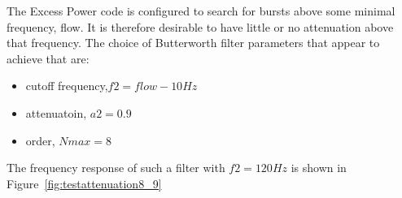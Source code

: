 \documentclass{article}
\begin{document}
The Excess Power code is configured to search for bursts above some 
minimal frequency, flow. It is therefore desirable to have little
or no attenuation above that frequency. The choice of Butterworth filter 
parameters that appear to achieve that are: 
\begin{itemize}
\item cutoff frequency,$f2 = flow - 10 Hz$
\item attenuatoin, $a2 = 0.9$
\item order, $Nmax = 8$
\end{itemize}
The frequency response of such a filter with $f2 = 120 Hz$ is shown in
Figure~\ref{fig:testattenuation8_9} 
\begin{figure}
\centering
{}

\end{figure}
\end{document}
